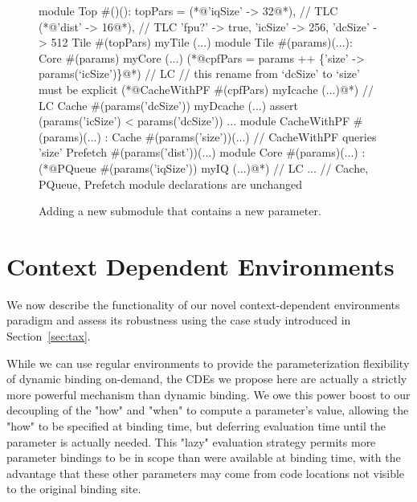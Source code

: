 \begin{figure}
\centering
\begin{phdl}
module Top #()():
  topPars = {(*@\textcolor[rgb]{0.8,0,0}{'iqSize' -> 32}@*),                                     // TLC
             (*@\textcolor[rgb]{1,0,0}{'dist' -> 16}@*),                                       // TLC
             'fpu?'   -> true,
             'icSize' -> 256,
             'dcSize' -> 512}
  Tile #(topPars) myTile (...)
module Tile #(params)(...):
  Core  #(params) myCore (...)
  (*@\textcolor[rgb]{1,0,0}{cpfPars = params ++ \{'size' -> params(`icSize')\}}@*)               // LC
    // this rename from `dcSize' to `size' must be explicit
  (*@\textcolor[rgb]{1,0,0}{CacheWithPF \#(cpfPars) myIcache (...)}@*)                          // LC
  Cache #(params('dcSize')) myDcache (...)
  assert (params('icSize') < params('dcSize')) ...
module CacheWithPF #(params)(...) :
  Cache #(params('size'))(...) // CacheWithPF queries 'size'
  Prefetch #(params('dist'))(...)
module Core #(params)(...) :
  (*@\textcolor[rgb]{.8,0,0}{PQueue \#(params('iqSize')) myIQ (...)}@*)                          // LC
... // Cache, PQueue, Prefetch module declarations are unchanged
\end{phdl} 
\caption{Adding a new submodule that contains a new parameter.}
\label{fig:env-delta}
\end{figure}

\section{Context Dependent Environments}
\label{sec:cde}

We now describe the functionality of our novel context-dependent environments paradigm and assess its robustness using the case study introduced in Section~\ref{sec:tax}.

While we can use regular environments to provide the parameterization flexibility of dynamic binding on-demand, 
the CDEs we propose here are actually a strictly more powerful mechanism than dynamic binding. 
We owe this power boost to our decoupling of the "how" and "when" to compute a parameter's value,
allowing the "how" to be specified at binding time,
but deferring evaluation time until the parameter is actually needed.
This "lazy" evaluation strategy permits more parameter bindings to be in scope
than were available at binding time, with the advantage that these
other parameters may come from code locations not visible to the original binding site.

